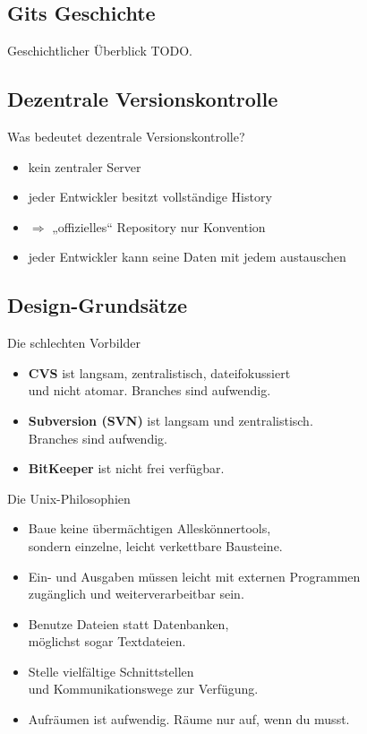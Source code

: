 \subsection{Gits Geschichte}

\begin{frame}{Geschichtlicher Überblick}
TODO.
\end{frame}

\subsection{Dezentrale Versionskontrolle}

\begin{frame}{Was bedeutet dezentrale Versionskontrolle?}
\begin{itemize}
	\item kein zentraler Server
	\item jeder Entwickler besitzt vollständige History
	\item $\Rightarrow$ „offizielles“ Repository nur Konvention
	\item jeder Entwickler kann seine Daten mit jedem austauschen
\end{itemize}
\end{frame}

\subsection{Design-Grundsätze}

\begin{frame}{Die schlechten Vorbilder}
\begin{itemize}
	\item \textbf{CVS} ist langsam, zentralistisch, dateifokussiert\\und nicht atomar. Branches sind aufwendig.
	\item \textbf{Subversion (SVN)} ist langsam und zentralistisch.\\Branches sind aufwendig.
	\item \textbf{BitKeeper} ist nicht frei verfügbar.
\end{itemize}
\end{frame}

\begin{frame}{Die Unix-Philosophien}
\begin{itemize}
	\item Baue keine übermächtigen Alleskönnertools,\\sondern einzelne, leicht verkettbare Bausteine.
	\item Ein- und Ausgaben müssen leicht mit externen Programmen\\zugänglich und weiterverarbeitbar sein.
	\item Benutze Dateien statt Datenbanken,\\möglichst sogar Textdateien.
	\item Stelle vielfältige Schnittstellen\\und Kommunikationswege zur Verfügung.
	\item Aufräumen ist aufwendig. Räume nur auf, wenn du musst.
\end{itemize}
\end{frame}


